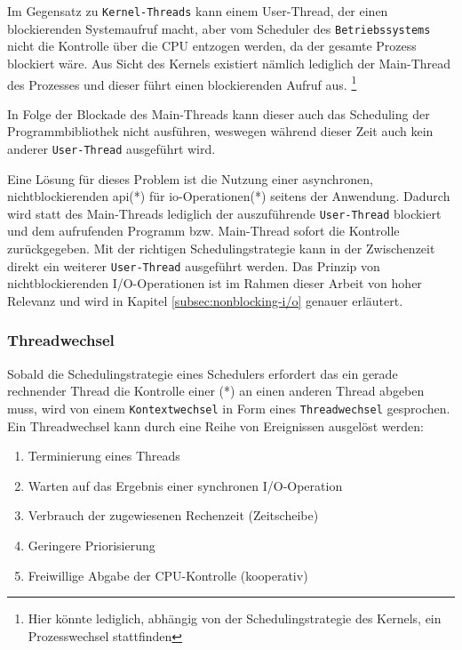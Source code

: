 Im Gegensatz zu \verb|Kernel-Threads| kann einem User-Thread, der einen blockierenden Systemaufruf macht,
aber vom Scheduler des \verb|Betriebssystems| nicht die Kontrolle über die CPU entzogen werden, da der gesamte Prozess blockiert wäre.
Aus Sicht des Kernels existiert nämlich lediglich der Main-Thread des Prozesses und dieser
führt einen blockierenden Aufruf aus. \footnote{Hier könnte lediglich, abhängig von der Schedulingstrategie des Kernels, ein Prozesswechsel stattfinden}

In Folge der Blockade des Main-Threads kann dieser auch das Scheduling der Programmbibliothek nicht ausführen, weswegen während dieser
Zeit auch kein anderer \verb|User-Thread| ausgeführt wird.

Eine Lösung für dieses Problem ist die Nutzung einer asynchronen, nichtblockierenden \acrshort{api}(*) für \gls{io}-Operationen(*)
seitens der Anwendung.
Dadurch wird statt des Main-Threads lediglich der auszuführende \verb|User-Thread| blockiert und dem aufrufenden Programm bzw. Main-Thread
sofort die Kontrolle zurückgegeben. Mit der richtigen Schedulingstrategie kann in der Zwischenzeit direkt ein
weiterer \verb|User-Thread| ausgeführt werden. \parencite[Kapitel 2.2.4]{Tanenbaum2016}
Das Prinzip von nichtblockierenden I/O-Operationen ist im Rahmen dieser Arbeit von hoher Relevanz und wird in Kapitel \ref{subsec:nonblocking-i/o}
genauer erläutert.

\subsubsection{Threadwechsel}
\label{subsubsec:threadwechsel}
Sobald die Schedulingstrategie eines Schedulers erfordert das ein gerade rechnender Thread die Kontrolle einer (*) an
einen anderen Thread abgeben muss, wird von einem \verb|Kontextwechsel| in Form eines \verb|Threadwechsel| gesprochen.
Ein Threadwechsel kann durch eine Reihe von Ereignissen ausgelöst werden:
\begin{enumerate}
  \item Terminierung eines Threads
  \item Warten auf das Ergebnis einer synchronen I/O-Operation
  \item Verbrauch der zugewiesenen Rechenzeit (Zeitscheibe)
  \item Geringere Priorisierung
  \item Freiwillige Abgabe der CPU-Kontrolle (kooperativ)
\end{enumerate}

